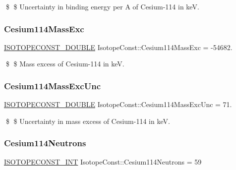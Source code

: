 \$ \$ Uncertainty in binding energy per A of Cesium-\/114 in keV. \mbox{\label{group___isotope_const-_cesium-_cs114_ga08d7cccc5cfcb90571dc0f069b690017}} 
\subsubsection{\texorpdfstring{Cesium114\+Mass\+Exc}{Cesium114MassExc}}
{\footnotesize\ttfamily \mbox{\hyperlink{group___isotope_const-_macros_ga8f45a7272ce02c0b4c65c44636ed719a}{I\+S\+O\+T\+O\+P\+E\+C\+O\+N\+S\+T\+\_\+\+D\+O\+U\+B\+LE}} Isotope\+Const\+::\+Cesium114\+Mass\+Exc = -\/54682.}

\$ \$ Mass excess of Cesium-\/114 in keV. \mbox{\label{group___isotope_const-_cesium-_cs114_ga8fac3c11271498bcf164992ea00f1208}} 
\subsubsection{\texorpdfstring{Cesium114\+Mass\+Exc\+Unc}{Cesium114MassExcUnc}}
{\footnotesize\ttfamily \mbox{\hyperlink{group___isotope_const-_macros_ga8f45a7272ce02c0b4c65c44636ed719a}{I\+S\+O\+T\+O\+P\+E\+C\+O\+N\+S\+T\+\_\+\+D\+O\+U\+B\+LE}} Isotope\+Const\+::\+Cesium114\+Mass\+Exc\+Unc = 71.}

\$ \$ Uncertainty in mass excess of Cesium-\/114 in keV. \mbox{\label{group___isotope_const-_cesium-_cs114_ga7e958a21c075dda6fd6895e7640febe2}} 
\subsubsection{\texorpdfstring{Cesium114\+Neutrons}{Cesium114Neutrons}}
{\footnotesize\ttfamily \mbox{\hyperlink{group___isotope_const-_macros_ga5f18360b3e99483a35c32d789e62621c}{I\+S\+O\+T\+O\+P\+E\+C\+O\+N\+S\+T\+\_\+\+I\+NT}} Isotope\+Const\+::\+Cesium114\+Neutrons = 59}

